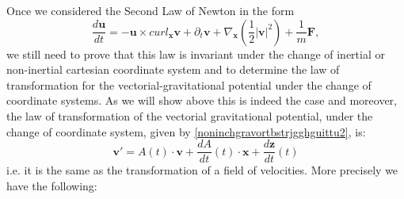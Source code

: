 \documentclass{article}
\theoremstyle{definition}
\theoremstyle{remark}
\renewcommand{\vec}[1]{\mathbf{#1}}
\newcommand{\er}{\eqref}
\newcommand{\er}{\eqref}
\begin{document}
Once we considered the Second Law of Newton in the form
\begin{equation}\label{MaxVacFull1ninshtrgravorthjhjlhhjPPN}
\frac{d\vec u}{dt}=-\vec u\times curl_{\vec x}\vec
v+\partial_{t}\vec v+\nabla_{\vec x}\left(\frac{1}{2}|\vec
v|^2\right)+\frac{1}{m}\vec F,
\end{equation}
we still need to prove that this law is invariant under the change
of inertial or non-inertial cartesian coordinate system and to
determine the law of transformation for the vectorial-gravitational
potential under the change of coordinate systems. As we will show
above this is indeed the case and moreover, the law of
transformation of the vectorial gravitational potential, under the
change of coordinate system, given by
\er{noninchgravortbstrjgghguittu2}, is:
$$\vec v'=A(t)\cdot \vec
v+\frac{dA}{dt}(t)\cdot\vec x+\frac{d\vec z}{dt}(t)$$ i.e. it is the
same as the transformation of a field of velocities. More precisely
we have the following:
\end{document}
